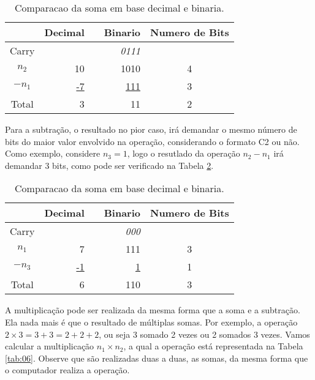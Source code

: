 \documentclass[12pt]{article}
\begin{document}
\begin{table}[ht]
	\centering
    \caption{Comparacao da soma em base decimal e binaria.}
    \begin{tabular}{crrrc}
    \hline
    	  & Decimal & & Binario & Numero de Bits \\
    \hline      
    Carry & 	& & \textit{0111} & \\
    $n_2$ & 10	& & 1010 & 4 \\
    $-n_1$ & \underline{-7} & & \underline{111} & 3 \\
    Total & 3	& & 11 & 2\\
    \hline
	\end{tabular}
    \label{tab:04}
\end{table}

Para a subtração, o resultado no pior caso, irá demandar o mesmo número de bits
do maior valor envolvido na operação, considerando o formato C2 ou não. Como
exemplo, considere $n_3=1$, logo o resutlado da operação $n_2 - n_1$ irá
demandar 3 bits, como pode ser verificado na Tabela \ref{tab:05}.

\begin{table}[ht]
	\centering
    \caption{Comparacao da soma em base decimal e binaria.}
    \begin{tabular}{crrrc}
    \hline
    	  & Decimal & & Binario & Numero de Bits \\
    \hline      
    Carry & 	& & \textit{000} & \\
    $n_1$ & 7	& & 111 & 3 \\
    $-n_3$ & \underline{-1} & & \underline{1} & 1 \\
    Total & 6	& & 110 & 3\\
    \hline
	\end{tabular}
    \label{tab:05}
\end{table}

A multiplicação pode ser realizada da mesma forma que a soma e a subtração. Ela
nada mais é que o resultado de múltiplas somas. Por exemplo, a operação $2
\times 3 = 3 + 3 = 2 + 2 + 2$, ou seja 3 somado 2 vezes ou 2 somados 3 vezes.
Vamos calcular a multiplicação $n_1 \times n_2$, a qual a operação está
representada na Tabela \ref{tab:06}. Observe que são realizadas duas a duas, as
somas, da mesma forma que o computador realiza a operação.
\end{document}
